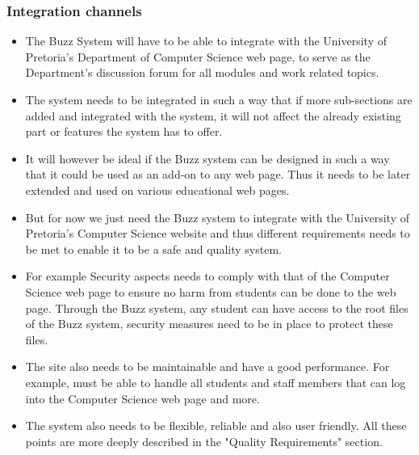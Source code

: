 \documentclass[a4paper]{article}
\begin{document}
\subsubsection{Integration channels }
\begin{itemize}
\item The Buzz System will have to be able to integrate with the University of Pretoria's Department of Computer Science web page, to serve as the Department's discussion forum for all modules and work related topics.  
\item The system needs to be integrated in such a way that if more sub-sections are added and integrated with the system, it will not affect the already existing part or features the system has to offer. 
\item It will however be ideal if the Buzz system can be designed in such a way that it could be used as an add-on to any web page. Thus it needs to be later extended and used on various educational web pages.
\item But for now we just need the Buzz system to integrate with the  University of Pretoria's Computer Science website and thus different requirements needs to be met to enable it to be a safe and quality system. 
\item For example Security aspects needs to comply with that of the Computer Science web page to ensure no harm from students can be done to the web page. Through the Buzz system, any student can have access to the root files of the Buzz system, security measures need to be in place to protect these files.
\item The site also needs to be maintainable and  have a good performance. For example, must be able to handle all students and staff members that can log into the Computer Science web page and more.
\item The system also needs to be flexible, reliable and also user friendly. All these points are more deeply described in the "Quality Requirements" section.
\end{itemize}
\end{document}
